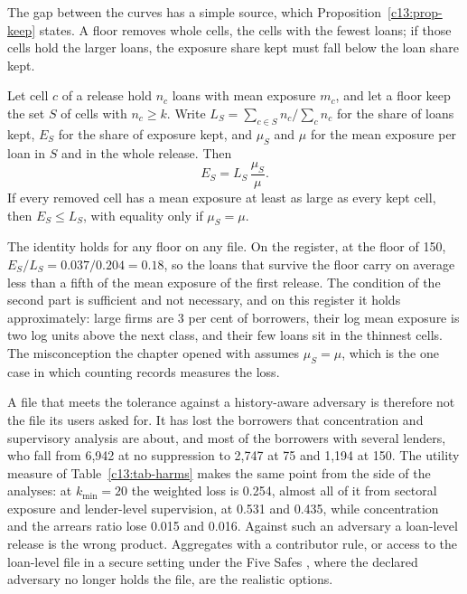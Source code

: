 The gap between the curves has a simple source, which Proposition~\ref{c13:prop-keep}
states. A floor removes whole cells, the cells with the fewest loans; if those cells
hold the larger loans, the exposure share kept must fall below the loan share kept.

\begin{proposition}\label{c13:prop-keep}
Let cell $c$ of a release hold $n_c$ loans with mean exposure $m_c$, and let a floor
keep the set $S$ of cells with $n_c \ge k$. Write $L_S = \sum_{c\in S} n_c / \sum_c n_c$
for the share of loans kept, $E_S$ for the share of exposure kept, and $\mu_S$ and
$\mu$ for the mean exposure per loan in $S$ and in the whole release. Then
\begin{equation}\label{c13:eq-keep}
E_S = L_S \, \frac{\mu_S}{\mu}.
\end{equation}
If every removed cell has a mean exposure at least as large as every kept cell, then
$E_S \le L_S$, with equality only if $\mu_S = \mu$.
\end{proposition}

The identity holds for any floor on any file. On the register, at the floor of 150,
$E_S/L_S = 0.037/0.204 = 0.18$, so the loans that survive the floor carry on average
less than a fifth of the mean exposure of the first release.
The condition of the second part is sufficient and not necessary, and on this
register it holds approximately: large firms are 3 per cent of borrowers, their log
mean exposure is two log units above the next class, and their few loans sit in the
thinnest cells. The misconception the chapter opened with assumes $\mu_S = \mu$, which
is the one case in which counting records measures the loss.

A file that meets the tolerance against a history-aware adversary is therefore not
the file its users asked for. It has lost the borrowers that concentration and
supervisory analysis are about, and most of the borrowers with several lenders, who
fall from 6{,}942 at no suppression to 2{,}747 at 75 and 1{,}194 at 150.
The utility measure of Table~\ref{c13:tab-harms} makes the same point from the side of
the analyses: at $k_{\min}=20$ the weighted loss is 0.254, almost all of it from
sectoral exposure and lender-level supervision, at 0.531 and 0.435, while
concentration and the arrears ratio lose 0.015 and 0.016.
Against such an adversary a loan-level release is the wrong product. Aggregates with a
contributor rule, or access to the loan-level file in a secure setting under the Five
Safes \citep{desai2016}, where the declared adversary no longer holds the file, are the
realistic options.

